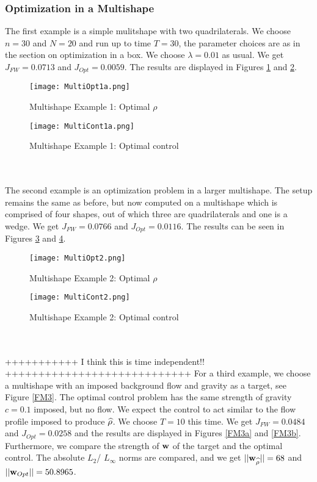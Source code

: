\subsubsection{Optimization in a Multishape}
The first example is a simple mulitshape with two quadrilaterals. We choose $n = 30$ and $N = 20$ and run up to time $T = 30$, the parameter choices are as in the section on optimization in a box. We choose $\lambda = 0.01$ as usual. We get $J_{FW} = 0.0713$ and $J_{Opt} = 0.0059$. The results are displayed in Figures \ref{FM0} and \ref{FM0a}.
\begin{figure}[h]
	\centering
	\texttt{[image: MultiOpt1a.png]}
	\caption{Multishape Example 1: Optimal $\rho$} 
	\label{FM0}
\end{figure}
\begin{figure}[h]
	\centering
	\texttt{[image: MultiCont1a.png]}
	\caption{Multishape Example 1: Optimal control} 
	\label{FM0a}
\end{figure}
\\
\\
The second example is an optimization problem in a larger multishape. The setup remains the same as before, but now computed on a multishape which is comprised of four shapes, out of which three are quadrilaterals and one is a wedge. We get $J_{FW} = 0.0766$ and $J_{Opt} = 0.0116$. The results can be seen in Figures \ref{FM1a} and \ref{FM2a}.
\begin{figure}[h]
	\centering
	\texttt{[image: MultiOpt2.png]}
	\caption{Multishape Example 2: Optimal $\rho$} 
	\label{FM1a}
\end{figure}
\begin{figure}[h]
	\centering
	\texttt{[image: MultiCont2.png]}
	\caption{Multishape Example 2: Optimal control} 
	\label{FM2a}
\end{figure}
\\
\\
+++++++++++ I think this is time independent!! ++++++++++++++++++++++++++++
For a third example, we choose a multishape with an imposed background flow and gravity as a target, see Figure \ref{FM3}. The optimal control problem has the same strength of gravity $c = 0.1$ imposed, but no flow. We expect the control to act similar to the flow profile imposed to produce $\widehat \rho$. We choose $T = 10$ this time.
We get $J_{FW} = 0.0484$ and $J_{Opt} = 0.0258$ and the results are displayed in Figures \ref{FM3a} and \ref{FM3b}. Furthermore, we compare the strength of $\mathbf{w}$ of the target and the optimal control. The absolute $L_2$/ $L_\infty$ norms are compared, and we get $||\mathbf{w}_{\widehat \rho}|| = 68$ and $||\mathbf{w}_{Opt}|| = 50.8965$.
